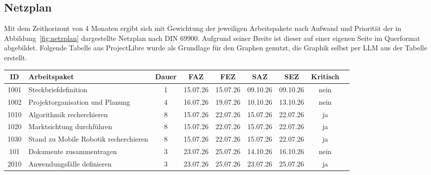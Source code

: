 \documentclass[
  a4paper,
  12pt,
  DIV=12,        %
  parskip=half,  %
  headings=small %
]{scrartcl}
\theoremstyle{definition}
\theoremstyle{definition}
\begin{document}
\newpage
\subsection{Netzplan}
Mit dem Zeithorizont von 4 Monaten ergibt sich mit Gewichtung der jeweiligen Arbeitspakete nach Aufwand und Priorität der in Abbildung~\ref{fig:netzplan} dargestellte Netzplan nach DIN 69900. Aufgrund seiner Breite ist dieser auf einer eigenen Seite im Querformat abgebildet. Folgende Tabelle aus ProjectLibre wurde als Grundlage für den Graphen genutzt, die Graphik selbst per LLM aus der Tabelle erstellt.




\begin{tabularx}{\textwidth}{cX@{}ccccccc}
\toprule
\footnotesize
\textbf{ID} & \footnotesize\textbf{Arbeitspaket} & \footnotesize\textbf{Dauer} & \footnotesize\textbf{FAZ} & \footnotesize\textbf{FEZ} & \footnotesize\textbf{SAZ} & \footnotesize\textbf{SEZ} & \footnotesize\textbf{Kritisch}\\
\midrule
\footnotesize 1001 & \footnotesize Steckbrief\-definition &	\footnotesize 1 &	\footnotesize 15.07.26 & \footnotesize 15.07.26	 & \footnotesize 09.10.26	 & \footnotesize 09.10.26 & 	 \footnotesize 	nein \\
\footnotesize 1002	 & \footnotesize Projekt\-organisation und Planung & 	\footnotesize 4	 & \footnotesize 16.07.26	 & \footnotesize 19.07.26	 & \footnotesize 10.10.26	 & \footnotesize 13.10.26	& \footnotesize nein \\
\footnotesize 1010	 & \footnotesize Algorithmik recherchieren & 	\footnotesize 8	 & \footnotesize 15.07.26	 & \footnotesize 22.07.26	 & \footnotesize 15.07.26	 & \footnotesize 22.07.26	 & 	\footnotesize ja \\
\footnotesize 1020 & \footnotesize Marktsichtung durchführen & \footnotesize 	8	 & \footnotesize 15.07.26	 & \footnotesize 22.07.26 & \footnotesize 	15.07.26 & \footnotesize 	22.07.26 &  \footnotesize ja \\
\footnotesize 1030	 & \footnotesize Stand zu Mobile Robotik recherchieren	 & \footnotesize 8	 & \footnotesize 15.07.26	 & \footnotesize 22.07.26	 & \footnotesize 15.07.26	 & \footnotesize 22.07.26	 & \footnotesize ja\\
\footnotesize 101	 & \footnotesize Dokumente zusammentragen	 & \footnotesize 3	 & \footnotesize 23.07.26 & \footnotesize 	25.07.26	 & \footnotesize 14.10.26 & \footnotesize 	16.10.26	 & \footnotesize nein \\
\footnotesize 2010	 & \footnotesize Anwendungsfälle definieren	 & \footnotesize 3	 & \footnotesize 23.07.26	 & \footnotesize 25.07.26 & \footnotesize 	23.07.26	 & \footnotesize 25.07.26	 & \footnotesize 	ja \\

\end{tabularx}
\end{document}
